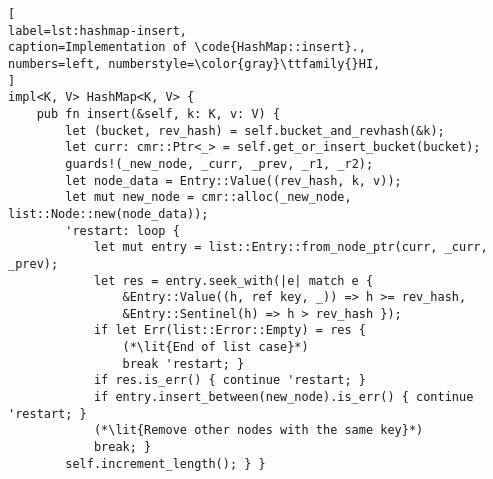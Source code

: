 \begin{lstlisting}[
label=lst:hashmap-insert,
caption=Implementation of \code{HashMap::insert}.,
numbers=left, numberstyle=\color{gray}\ttfamily{}HI,
]
impl<K, V> HashMap<K, V> {
    pub fn insert(&self, k: K, v: V) {
        let (bucket, rev_hash) = self.bucket_and_revhash(&k);
        let curr: cmr::Ptr<_> = self.get_or_insert_bucket(bucket);
        guards!(_new_node, _curr, _prev, _r1, _r2);
        let node_data = Entry::Value((rev_hash, k, v));
        let mut new_node = cmr::alloc(_new_node, list::Node::new(node_data));
        'restart: loop {
            let mut entry = list::Entry::from_node_ptr(curr, _curr, _prev);
            let res = entry.seek_with(|e| match e {
                &Entry::Value((h, ref key, _)) => h >= rev_hash,
                &Entry::Sentinel(h) => h > rev_hash });
            if let Err(list::Error::Empty) = res {
                (*\lit{End of list case}*)
                break 'restart; }
            if res.is_err() { continue 'restart; }
            if entry.insert_between(new_node).is_err() { continue 'restart; }
            (*\lit{Remove other nodes with the same key}*)
            break; }
        self.increment_length(); } }
\end{lstlisting}
